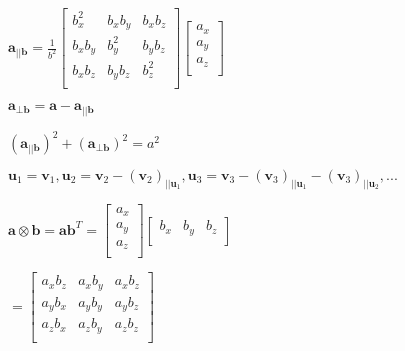 \documentclass{article}
\def\lthtmlcheckvsize{\ifdim\ht\sizebox<\vsize 
  \ifdim\wd\sizebox<\hsize\expandafter\hfill\fi \expandafter\vfill
  \else\expandafter\vss\fi}%
\begin{document}
{\newpage\clearpage
{}%
$ \textbf{a}_{||\textbf{b}} = \frac{1}{b^2} \begin{bmatrix}
  b_x^2 & b_x b_y & b_x b_z \\
  b_x b_y & b_y^2 & b_y b_z \\
  b_x b_z & b_y b_z & b_z^2 \\
\end{bmatrix} 
\begin{bmatrix}
a_x \\
a_y \\
a_z \\
\end{bmatrix}
$%
\lthtmlindisplaymathZ
\lthtmlcheckvsize\clearpage}

{\newpage\clearpage
{}%
$ \textbf{a}_{\perp \textbf{b}} = \textbf{a} - \textbf{a}_{||\textbf{b}} $%
\lthtmlindisplaymathZ
\lthtmlcheckvsize\clearpage}

{\newpage\clearpage
{}%
$ (\textbf{a}_{||\textbf{b}})^2 + (\textbf{a}_{\perp \textbf{b}})^2 = a^2 $%
\lthtmlindisplaymathZ
\lthtmlcheckvsize\clearpage}

{\newpage\clearpage
{}%
$ \textbf{u}_1 = \textbf{v}_1, 
\textbf{u}_2 = \textbf{v}_2 - (\textbf{v}_2)_{||\textbf{u}_1}, 
\textbf{u}_3 = \textbf{v}_3 - (\textbf{v}_3)_{||\textbf{u}_1} - (\textbf{v}_3)_{||\textbf{u}_2}, ... $%
\lthtmlindisplaymathZ
\lthtmlcheckvsize\clearpage}

{\newpage\clearpage
{}%
$ \textbf{a} \otimes \textbf{b} = \textbf{a} \textbf{b}^T = \begin{bmatrix}a_x \\a_y \\a_z \\\end{bmatrix}
\begin{bmatrix}b_x & b_y & b_z \\\end{bmatrix} $%
\lthtmlindisplaymathZ
\lthtmlcheckvsize\clearpage}

{\newpage\clearpage
{}%
$ =
\begin{bmatrix}
a_x b_z & a_x b_y & a_x b_z \\
a_y b_x & a_y b_y & a_y b_z \\
a_z b_x & a_z b_y & a_z b_z \\
\end{bmatrix}
$%
\lthtmlindisplaymathZ
\lthtmlcheckvsize\clearpage}
\end{document}
